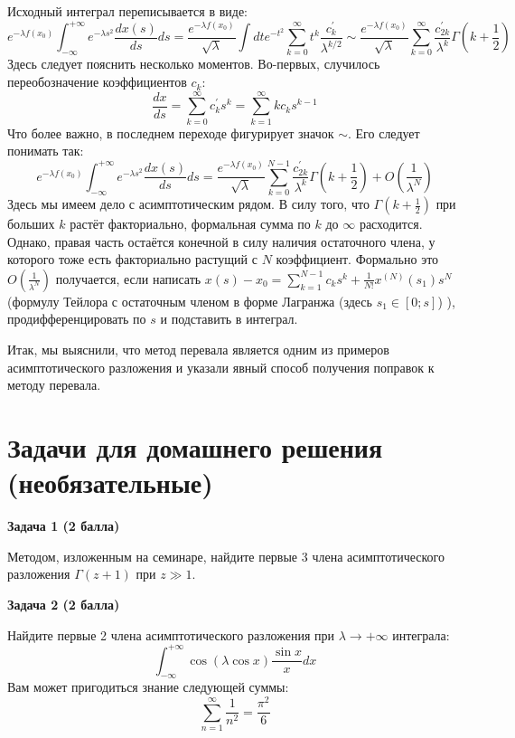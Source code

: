 \documentclass[a4paper,12pt]{article}
\begin{document}
\noindent
Исходный интеграл переписывается в виде:
$$
e^{-\lambda f(x_0)}\int_{-\infty}^{+\infty}e^{-\lambda s^2}\frac{dx(s)}{ds}ds=\frac{e^{-\lambda f(x_0)}}{\sqrt{\lambda}}\int dt e^{-t^2}\sum_{k=0}^{\infty}t^k \frac{c^{'}_k}{\lambda^{k/2}}\sim\frac{e^{-\lambda f(x_0)}}{\sqrt{\lambda}}\sum_{k=0}^{\infty}\frac{c_{2k}^{'}}{\lambda^{k}}\Gamma\left(k+\frac{1}{2}\right)
$$
Здесь следует пояснить несколько моментов. Во-первых, случилось переобозначение коэффициентов $c_k$:
$$
\frac{dx}{ds}=\sum_{k=0}^{\infty}c_k^{'}s^k=\sum_{k=1}^{\infty}kc_{k}s^{k-1}
$$
Что более важно, в последнем переходе фигурирует значок $\sim$. Его следует понимать так:
$$
e^{-\lambda f(x_0)}\int_{-\infty}^{+\infty}e^{-\lambda s^2}\frac{dx(s)}{ds}ds=\frac{e^{-\lambda f(x_0)}}{\sqrt{\lambda}}\sum_{k=0}^{N-1}\frac{c_{2k}^{'}}{\lambda^{k}}\Gamma\left(k+\frac{1}{2}\right)+O\left(\frac{1}{\lambda^{N}}\right)
$$
Здесь мы имеем дело с асимптотическим рядом. В силу того, что $\Gamma\left(k+\frac{1}{2}\right)$ при больших $k$ растёт факториально, формальная сумма по $k$ до $\infty$ расходится. Однако, правая часть остаётся конечной в силу наличия остаточного члена, у которого тоже есть факториально растущий с $N$ коэффициент. Формально это $O\left(\frac{1}{\lambda^{N}}\right)$ получается, если написать $x(s)-x_0=\sum_{k=1}^{N-1}c_k s^k+\frac{1}{N!}x^{(N)}(s_1)s^{N}$ (формулу Тейлора с остаточным членом в форме Лагранжа (здесь $s_1\in[0;s]$) ), продифференцировать по $s$ и подставить в интеграл.

\noindent
Итак, мы выяснили, что метод перевала является одним из примеров асимптотического разложения и указали явный способ получения поправок к методу перевала.
\section*{Задачи для домашнего решения (необязательные)}

\noindent \textbf {Задача 1 (2 балла)} 

\noindent Методом, изложенным на семинаре, найдите первые 3 члена асимптотического разложения $\Gamma(z+1)$ при $z\gg1$.

\noindent \textbf {Задача 2 (2 балла)}

\noindent Найдите первые 2 члена асимптотического разложения при $\lambda\to+\infty$ интеграла:
$$
\int_{-\infty}^{+\infty}\cos\left(\lambda\cos x\right)\frac{\sin x}{x}dx
$$ 
Вам может пригодиться знание следующей суммы:
$$
\sum_{n=1}^{\infty}\frac{1}{n^2}=\frac{\pi^2}{6}
$$
\end{document}
